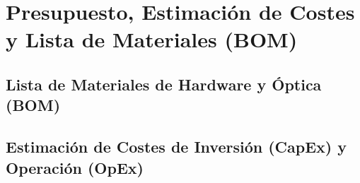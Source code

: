 \section{Presupuesto, Estimación de Costes y Lista de Materiales (BOM)}
\label{sec:presupuesto_bom}

\subsection{Lista de Materiales de Hardware y Óptica (BOM)}
\label{subsec:bom_hardware}

\subsection{Estimación de Costes de Inversión (CapEx) y Operación (OpEx)}
\label{subsec:costes_capex_opex}
